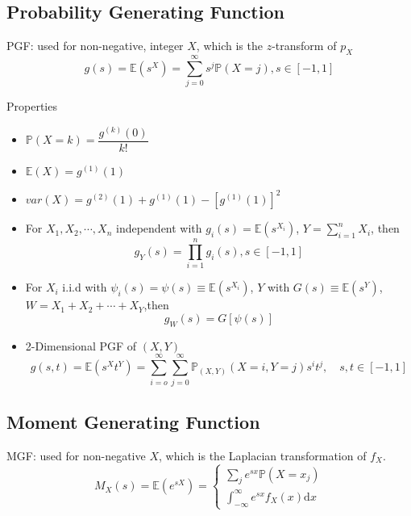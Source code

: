 \subsection{Probability Generating Function}
    PGF: used for non-negative, integer $X$, which is the $ z $-transform of $ p_X $
    \begin{equation}
        g(s)=\mathbb{E}(s^X)=\sum_{j=0}^\infty s^j\mathbb{P}(X=j)    ,s\in[-1,1]
    \end{equation}

\begin{point}
        Properties
\end{point}
    \begin{itemize}[topsep=2pt,itemsep=0pt]
        \item $\mathbb{P}(X=k)=\dfrac{g^{(k)}(0)}{k!}$
        \item $\mathbb{E}(X)=g^{(1)}(1)$
        \item $var(X)=g^{(2)}(1)+g^{(1)}(1)-[g^{(1)}(1)]^2 $
        \item For $X_1,X_2,\cdots,X_n$ independent with $g_i(s)=\mathbb{E}(s^{X_i})$, $Y={\displaystyle \sum_{i=1}^n} X_i$, then
        \begin{equation}    
            g_Y(s)=\prod_{i=1}^n g_i(s),s\in[-1,1]
        \end{equation}
        \item For ${X_i}$ i.i.d with $\psi_i(s)=\psi(s)\equiv \mathbb{E}(s^{X_i})$, $Y$ with $G(s)\equiv\mathbb{E}(s^{Y})$, $W=X_1+X_2+\cdots +X_Y$,then
        \begin{equation}    
            g_W(s)=G[\psi(s)]    
        \end{equation}
        \item 2-Dimensional PGF of $(X,Y)$
        \begin{equation}    
            g(s,t)=\mathbb{E}(s^Xt^Y)=\sum_{i=o}^\infty\sum_{j=0}^\infty \mathbb{P}_{(X,Y)}(X=i,Y=j)s^it^j,\quad s,t\in[-1,1]
        \end{equation}
    \end{itemize}
\subsection{Moment Generating Function}
    MGF: used for non-negative $ X $, which is the Laplacian transformation of $ f_X $.
    \begin{equation}
        M_X(s)=\mathbb{E}(e^{sX})=\begin{cases}
            \sum_je^{sx}\mathbb{P}(X=x_j)\\
            \int_{-\infty}^\infty e^{sx}f_X(x)\mathrm{d}x
        \end{cases}
    \end{equation}

